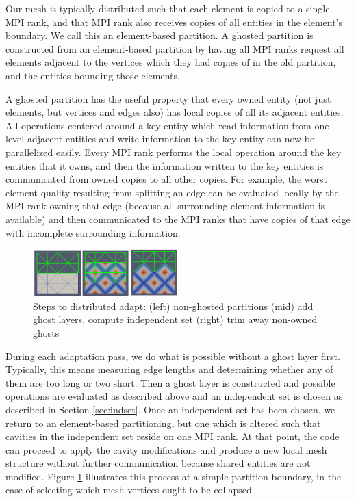 Our mesh is typically distributed such that each element
is copied to a single MPI rank, and that MPI rank also receives
copies of all entities in the element's boundary.
We call this an element-based partition.
A ghosted partition is constructed
from an element-based partition by having all MPI ranks request
all elements adjacent to the vertices which they had copies
of in the old partition, and the entities bounding those elements.

A ghosted partition has the useful property that every owned entity
(not just elements, but vertices and edges also) has local copies
of all its adjacent entities.
All operations centered around a key entity which read information
from one-level adjacent entities and write information to the
key entity can now be parallelized easily.
Every MPI rank performs the local operation around the key entities
that it owns, and then the information written to the key entities
is communicated from owned copies to all other copies.
For example, the worst element quality resulting from splitting an
edge can be evaluated locally by the MPI rank owning that edge
(because all surrounding element information is available)
and then communicated to the MPI ranks that have copies of that edge
with incomplete surrounding information.

\begin{figure}[t]\vspace*{4pt}
\centerline{
\includegraphics[width=0.5\textwidth]{mpi_indset.png}}
\caption{Steps to distributed adapt: (left) non-ghosted partitions (mid)
add ghost layers, compute independent set (right)
trim away non-owned ghosts}\vspace*{-6pt}
\label{fig:mpi_indset}
\end{figure}

During each adaptation pass, we do what is possible without a ghost
layer first. Typically, this means measuring edge lengths and determining
whether any of them are too long or two short.
Then a ghost layer is constructed and possible operations are evaluated
as described above and an independent set is chosen as described in
Section \ref{sec:indset}.
Once an independent set has been chosen, we return to an element-based
partitioning, but one which is altered such that cavities in the independent
set reside on one MPI rank.
At that point, the code can proceed to apply the cavity modifications
and produce a new local mesh structure without further communication
because shared entities are not modified.
Figure \ref{fig:mpi_indset} illustrates this process at a simple partition boundary,
in the case of selecting which mesh vertices ought to be collapsed.

